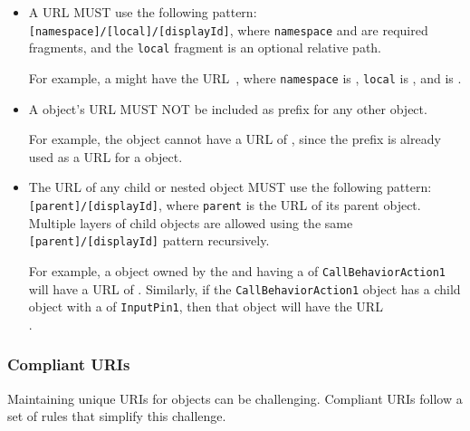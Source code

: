 \begin{itemize}

 \item A  URL MUST use the following pattern:
  \texttt{[namespace]/[local]/[displayId]},  where \texttt{namespace} and  are required fragments, and the \texttt{local} fragment is an optional relative path.
  
  	For example, a  might have the URL~, where \texttt{namespace} is , \texttt{local} is , and  is .

  \item A  object's URL MUST NOT be included as prefix for any other  object.
  
  	For example, the   object cannot have a URL of , since the  prefix is already used as a URL for a  object.

  \item The URL of any child or nested object MUST use the following pattern:\texttt{[parent]/[displayId]}, where \texttt{parent} is the URL of its parent object.
	Multiple layers of child objects are allowed using the same\\ \texttt{[parent]/[displayId]} pattern recursively.
	
	For example, a  object owned by the   and having a  of \texttt{CallBehaviorAction1} will have a URL of .
	Similarly, if the \texttt{CallBehaviorAction1} object has a  child object with a  of \texttt{InputPin1}, then that object will have the URL\\ .
  \end{itemize}

\subsubsection{Compliant URIs}
\label{sec:compliant}

Maintaining unique URIs for objects can be challenging.  Compliant URIs follow a set of rules that simplify this challenge.

